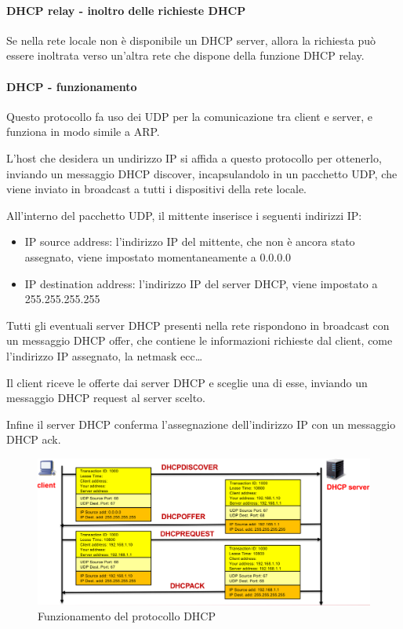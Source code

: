 \paragraph{DHCP relay - inoltro delle richieste DHCP}
Se nella rete locale non è disponibile un DHCP server, allora la richiesta può essere inoltrata  verso un'altra rete che dispone della funzione DHCP relay.

\paragraph{DHCP - funzionamento}
Questo protocollo fa uso dei UDP per la comunicazione tra client e server, e funziona in modo simile a ARP.

L'host che desidera un undirizzo IP si affida a questo protocollo per ottenerlo, inviando un messaggio DHCP discover, incapsulandolo in un pacchetto UDP, che viene inviato in broadcast a tutti i dispositivi della rete locale.

All'interno del pacchetto UDP, il mittente inserisce i seguenti indirizzi IP:
\begin{itemize}
    \item IP source address: l'indirizzo IP del mittente, che non è ancora stato assegnato, viene impostato momentaneamente a 0.0.0.0
    \item IP destination address: l'indirizzo IP del server DHCP, viene impostato a 255.255.255.255
\end{itemize}

Tutti gli eventuali server DHCP presenti nella rete rispondono in broadcast con un messaggio DHCP offer, che contiene le informazioni richieste dal client, come l'indirizzo IP assegnato, la netmask ecc\dots

Il client riceve le offerte dai server DHCP e sceglie una di esse, inviando un messaggio DHCP request al server scelto.

Infine il server DHCP conferma l'assegnazione dell'indirizzo IP con un messaggio DHCP ack.

    \begin{figure}[h!]
    \centering
    \includegraphics[width=1\textwidth]{images/dhcp.png}
    \caption{Funzionamento del protocollo DHCP}
    \label{fig:dhcp}
\end{figure}

